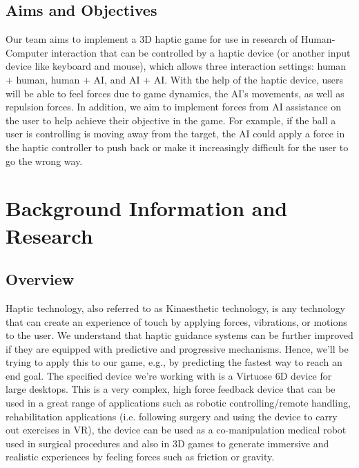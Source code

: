 \documentclass[a4paper]{article}
\begin{document}
\subsection{Aims and Objectives}
Our team aims to implement a 3D haptic game for use in research of Human-Computer interaction that can be controlled by a haptic device (or another input device like keyboard and mouse), which allows three interaction settings: human + human, human + AI, and AI + AI. With the help of the haptic device, users will be able to feel forces due to game dynamics, the AI’s movements, as well as repulsion forces. In addition, we aim to implement forces from AI assistance on the user to help achieve their objective in the game. For example, if the ball a user is controlling is moving away from the target, the AI could apply a force in the haptic controller to push back or make it increasingly difficult for the user to go the wrong way.

\section{Background Information and Research}
\subsection{Overview}
Haptic technology, also referred to as Kinaesthetic technology, is any technology that can create an experience of touch by applying forces, vibrations, or motions to the user. We understand that haptic guidance systems can be further improved if they are equipped with predictive and progressive mechanisms. Hence, we’ll be trying to apply this to our game, e.g., by predicting the fastest way to reach an end goal. The specified device we’re working with is a Virtuose 6D device for large desktops. This is a very complex, high force feedback device that can be used in a great range of applications such as robotic controlling/remote handling, rehabilitation applications (i.e. following surgery and using the device to carry out exercises in VR), the device can be used as a co-manipulation medical robot used in surgical procedures and also in 3D games to generate immersive and realistic experiences by feeling forces such as friction or gravity. 
\end{document}
